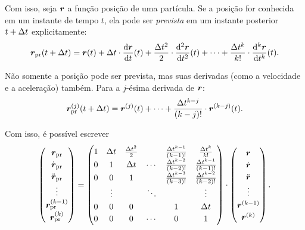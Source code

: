 Com isso, seja \(\bm{r}\) a função posição de uma partícula. Se a posição for conhecida em um instante de tempo \(t\), ela pode ser \textit{prevista} em um instante posterior \(t+\Delta t\) explicitamente:
\begin{equation} \label{eq:position_prediction}
	\predicted{\position}\pqty{t+\Dt} = \position\pqty{t} + \Dt\cdot\dv{\position}{t}\pqty{t} + \dfrac{\Dt^2}{2}\cdot \dv[2]{\position}{t}\pqty{t} + \dots + \dfrac{\Dt^\taylorOrder}{\taylorOrder!}\cdot \dv[\taylorOrder]{\position}{t}\pqty{t}.
\end{equation}

Não somente a posição pode ser prevista, mas suas derivadas (como a velocidade e a aceleração) também. Para a \(j\)-ésima derivada de \(\bm{r}\):
\[
	\predicted{\deriv{j}{\position}}\pqty{t + \Dt} = \deriv{j}{\position}\pqty{t} + \dots + \dfrac{\Dt^{\taylorOrder-j}}{\pqty{\taylorOrder-j}!}\cdot\deriv{\taylorOrder-j}{\position}\pqty{t}.
\]

Com isso, é possível escrever
\[
	\def\arraystretch{1.2}
\begin{pmatrix}
	\predicted{\position} \\
	\predicted{\deriv{1}{\position}} \\
	\predicted{\deriv{2}{\position}} \\
	\vdots \\
	\predicted{\deriv{\taylorOrder-1}{\position}} \\
	\predicted{\deriv{\taylorOrder}{\position}}
\end{pmatrix}
=
\begin{pmatrix}
	1 & \Dt & \frac{\Dt^2}{2} &  & \frac{\Dt^{\taylorOrder-1}}{\pqty{\taylorOrder-1}!} & \frac{\Dt^\taylorOrder}{\taylorOrder!} \\
	0 & 1 & \Dt & \cdots & \frac{\Dt^{\taylorOrder-2}}{\pqty{\taylorOrder-2}!} & \frac{\Dt^{\taylorOrder-1}}{\pqty{\taylorOrder-1}!} \\
	0 & 0 & 1 &  & \frac{\Dt^{\taylorOrder-3}}{\pqty{\taylorOrder-3}!} & \frac{\Dt^{\taylorOrder-2}}{\pqty{\taylorOrder-2}!} \\
     & \vdots & & \ddots & & \vdots \\
    0 & 0 & 0 &  & 1 & \Dt \\
    0 & 0 & 0 & \cdots & 0 & 1
\end{pmatrix}
\cdot
\begin{pmatrix}
	\position \\
	\deriv{1}{\position} \\
	\deriv{2}{\position} \\
	\vdots \\
	\deriv{\taylorOrder-1}{\position} \\
	\deriv{\taylorOrder}{\position}
\end{pmatrix}.
\]

